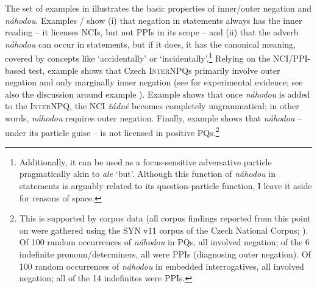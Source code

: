 \documentclass[output=paper,colorlinks,citecolor=brown]{langscibook}
\begin{document}
The set of examples in  illustrates the basic properties of inner/outer negation and \textit{náhodou}. Examples / show (i) that negation in statements always has the inner reading -- it licenses NCIs, but not PPIs in its scope -- and (ii) that the adverb \textit{náhodou} can occur in statements, but if it does, it has the canonical meaning, covered by concepts like `accidentally' or `incidentally'.\footnote{Additionally, it can be used as a focus-sensitive adversative particle pragmatically akin to \textit{ale} `but'. Although this function of \textit{náhodou} in statements is arguably related to its question-particle function, I leave it aside for reasons of space.} Relying on the NCI/PPI-based test, example  shows that Czech \textsc{InterNPQ}s primarily involve outer negation and only marginally inner negation (see \citealt{Stankova2023} for experimental evidence; see also the discussion around example ). Example  shows that once \textit{náhodou} is added to the \textsc{InterNPQ}, the NCI \textit{žádné} becomes completely ungrammatical; in other words, \textit{náhodou} requires outer negation. Finally, example  shows that \textit{náhodou} -- under its particle guise -- is not licensed in positive PQs.\footnote{This is supported by corpus data (all corpus findings reported from this point on were gathered using the SYN v11 corpus of the Czech National Corpus; \citealt{Kren.etal2022}). Of 100 random occurrences of \textit{náhodou} in PQs, all involved negation; of the 6 indefinite pronoun/determiners, all were PPIs (diagnosing outer negation). Of 100 random occurrences of \textit{náhodou} in embedded interrogatives, all involved negation; all of the 14 indefinites were PPIs.\label{sim:fn:corpus}}
\end{document}
